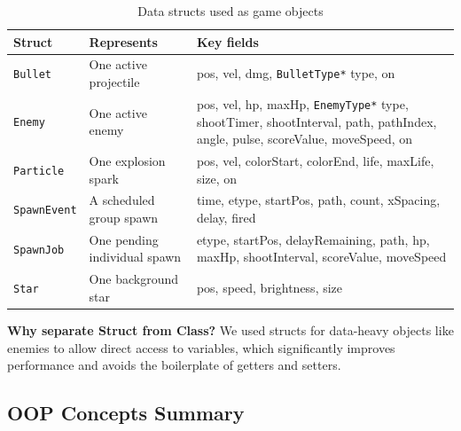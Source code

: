 \documentclass[11pt]{article}
\begin{document}
\begin{table}[H]
    \centering
    \caption{Data structs used as game objects}
    \label{tab:structs}
    \renewcommand{\arraystretch}{1.4}
    \begin{tabular}{|l|p{4.2cm}|p{5.5cm}|}
        \hline
        \textbf{Struct} & \textbf{Represents} & \textbf{Key fields} \\
        \hline
        \texttt{Bullet}     & One active projectile         & pos, vel, dmg, \texttt{BulletType*} type, on \\
        \hline
        \texttt{Enemy}      & One active enemy              & pos, vel, hp, maxHp, \texttt{EnemyType*} type, shootTimer, shootInterval, path, pathIndex, angle, pulse, scoreValue, moveSpeed, on \\
        \hline
        \texttt{Particle}   & One explosion spark           & pos, vel, colorStart, colorEnd, life, maxLife, size, on \\
        \hline
        \texttt{SpawnEvent} & A scheduled group spawn       & time, etype, startPos, path, count, xSpacing, delay, fired \\
        \hline
        \texttt{SpawnJob}   & One pending individual spawn  & etype, startPos, delayRemaining, path, hp, maxHp, shootInterval, scoreValue, moveSpeed \\
        \hline
        \texttt{Star}       & One background star           & pos, speed, brightness, size \\
        \hline
    \end{tabular}
\end{table}

\begin{notebox}
\textbf{Why separate Struct from Class?}
We used structs for data-heavy objects like enemies to allow direct access to variables, which significantly improves performance and avoids the boilerplate of getters and setters.
\end{notebox}

\subsection{OOP Concepts Summary}
\end{document}
